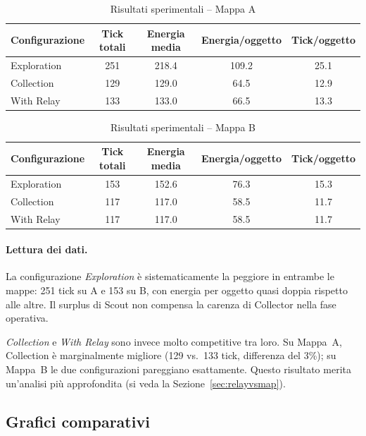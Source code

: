 \begin{table}[H]
  \centering
  \caption{Risultati sperimentali -- Mappa A}
  \label{tab:results_a}
  \begin{tabular}{lcccc}
    \toprule
    \textbf{Configurazione} & \textbf{Tick totali} & \textbf{Energia media} & \textbf{Energia/oggetto} & \textbf{Tick/oggetto} \\
    \midrule
    Exploration & 251 & 218.4 & 109.2 & 25.1 \\
    Collection  & 129 & 129.0 &  64.5 & 12.9 \\
    With Relay  & 133 & 133.0 &  66.5 & 13.3 \\
    \bottomrule
  \end{tabular}
\end{table}

\begin{table}[H]
  \centering
  \caption{Risultati sperimentali -- Mappa B}
  \label{tab:results_b}
  \begin{tabular}{lcccc}
    \toprule
    \textbf{Configurazione} & \textbf{Tick totali} & \textbf{Energia media} & \textbf{Energia/oggetto} & \textbf{Tick/oggetto} \\
    \midrule
    Exploration & 153 & 152.6 & 76.3 & 15.3 \\
    Collection  & 117 & 117.0 & 58.5 & 11.7 \\
    With Relay  & 117 & 117.0 & 58.5 & 11.7 \\
    \bottomrule
  \end{tabular}
\end{table}

\paragraph{Lettura dei dati.}
La configurazione \emph{Exploration} è sistematicamente la peggiore in entrambe le mappe: 251 tick su A e 153 su B, con energia per oggetto quasi doppia rispetto alle altre. Il surplus di Scout non compensa la carenza di Collector nella fase operativa.

\emph{Collection} e \emph{With Relay} sono invece molto competitive tra loro. Su Mappa~A, Collection è marginalmente migliore (129 vs.\ 133 tick, differenza del 3\%); su Mappa~B le due configurazioni pareggiano esattamente. Questo risultato merita un'analisi più approfondita (si veda la Sezione~\ref{sec:relayvsmap}).

\subsection{Grafici comparativi}

